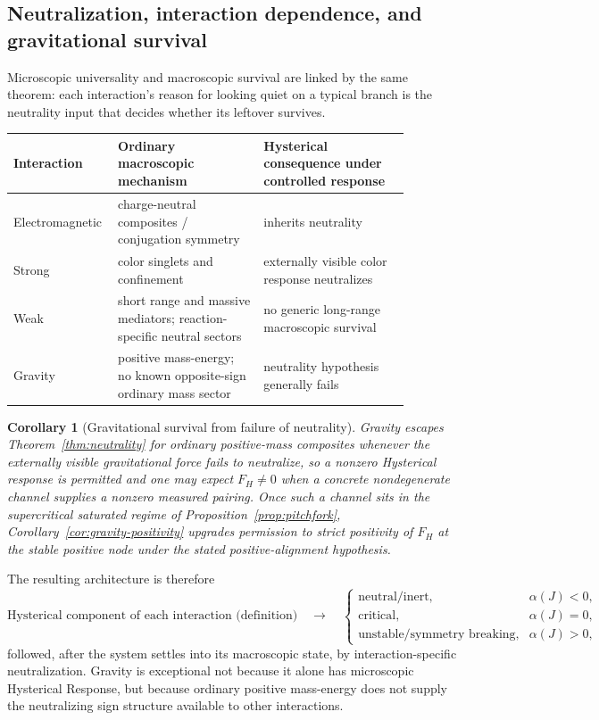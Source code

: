 \documentclass[11pt]{article}
\newtheorem{corollary}[theorem]{Corollary}
\theoremstyle{definition}
\theoremstyle{remark}
\begin{document}
\subsection{Neutralization, interaction dependence, and gravitational survival}
Microscopic universality and macroscopic survival are linked by the same theorem: each interaction's reason for looking quiet on a typical branch is the neutrality input that decides whether its leftover survives. 
\begin{center}
\begin{tabular}{p{0.18\linewidth}p{0.35\linewidth}p{0.35\linewidth}}
\toprule
Interaction & Ordinary macroscopic mechanism & Hysterical consequence under controlled response\\
\midrule
Electromagnetic & charge-neutral composites / conjugation symmetry & inherits neutrality\\
Strong & color singlets and confinement & externally visible color response neutralizes\\
Weak & short range and massive mediators; reaction-specific neutral sectors & no generic long-range macroscopic survival\\
Gravity & positive mass-energy; no known opposite-sign ordinary mass sector & neutrality hypothesis generally fails\\
\bottomrule
\end{tabular}
\end{center}

\begin{corollary}[Gravitational survival from failure of neutrality]\label{cor:gravity-failure}
Gravity escapes Theorem~\ref{thm:neutrality} for ordinary positive-mass composites whenever the externally visible gravitational force fails to neutralize, so a nonzero Hysterical response is permitted and one may expect $F_H\neq0$ when a concrete nondegenerate channel supplies a nonzero measured pairing.
Once such a channel sits in the supercritical saturated regime of Proposition~\ref{prop:pitchfork}, Corollary~\ref{cor:gravity-positivity} upgrades permission to strict positivity of $F_H$ at the stable positive node under the stated positive-alignment hypothesis.
\end{corollary}

The resulting architecture is therefore
\begin{equation}
 \boxed{\text{Hysterical component of each interaction (definition)}\quad\longrightarrow\quad
 \begin{cases}
 \text{neutral/inert}, & \alpha(J)<0,\\
 \text{critical}, & \alpha(J)=0,\\
 \text{unstable/symmetry breaking}, & \alpha(J)>0,
 \end{cases}}
\end{equation}
followed, after the system settles into its macroscopic state, by interaction-specific neutralization.  Gravity is exceptional not because it alone has microscopic Hysterical Response, but because ordinary positive mass-energy does not supply the neutralizing sign structure available to other interactions.
\end{document}
